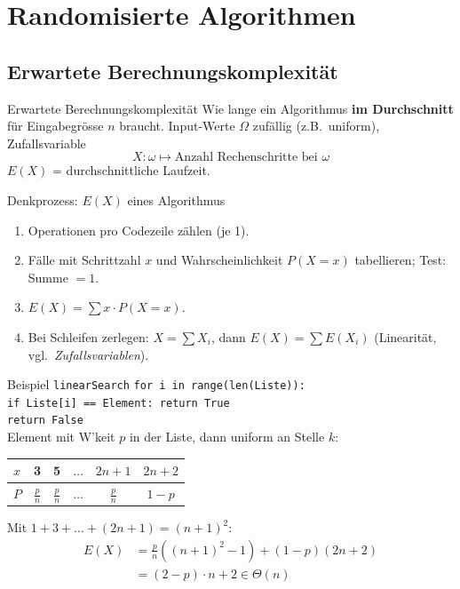 \documentclass[a4paper, fontsize=7pt]{scrartcl}
\renewcommand*{\arraystretch}{1.5}  %
\begin{document}
\section{Randomisierte Algorithmen}

\subsection{Erwartete Berechnungskomplexität}

\begin{mainbox}{Erwartete Berechnungskomplexität}
Wie lange ein Algorithmus \textbf{im Durchschnitt} für Eingabegrösse $n$ braucht.
Input-Werte $\Omega$ zufällig (z.B.\ uniform), Zufallsvariable
$$X : \omega \mapsto \text{Anzahl Rechenschritte bei } \omega$$
$\boxed{E(X)}$ = durchschnittliche Laufzeit.
\end{mainbox}

\begin{subbox}{Denkprozess: $E(X)$ eines Algorithmus}
\begin{enumerate}
    \item Operationen pro Codezeile zählen (je 1).
    \item Fälle mit Schrittzahl $x$ und Wahrscheinlichkeit $P(X = x)$ tabellieren;
          Test: Summe $= 1$.
    \item $E(X) = \sum x \cdot P(X = x)$.
    \item Bei Schleifen zerlegen: $X = \sum X_i$, dann
          $E(X) = \sum E(X_i)$ (Linearität, vgl.\ \emph{Zufallsvariablen}).
\end{enumerate}
\end{subbox}

\begin{subbox}{Beispiel \texttt{linearSearch}}
\texttt{for i in range(len(Liste)):}\\
\phantom{xx}\texttt{if Liste[i] == Element: return True}\\
\texttt{return False}\\[2pt]
Element mit W'keit $p$ in der Liste, dann uniform an Stelle $k$:
\renewcommand*{\arraystretch}{1.15}
\begin{center}
\begin{tabular}{l|cccc|c}
$x$ & 3 & 5 & $\ldots$ & $2n + 1$ & $2n + 2$ \\ \hline
$P$ & $\frac{p}{n}$ & $\frac{p}{n}$ & $\ldots$ & $\frac{p}{n}$ & $1 - p$
\end{tabular}
\end{center}
Mit $1 + 3 + \ldots + (2n + 1) = (n + 1)^2$:
\begin{align*}
E(X) &= \tfrac{p}{n}\left((n+1)^2 - 1\right) + (1 - p)(2n + 2)\\
&= \boxed{(2 - p) \cdot n + 2} \in \Theta(n)
\end{align*}
\end{subbox}
\end{document}
